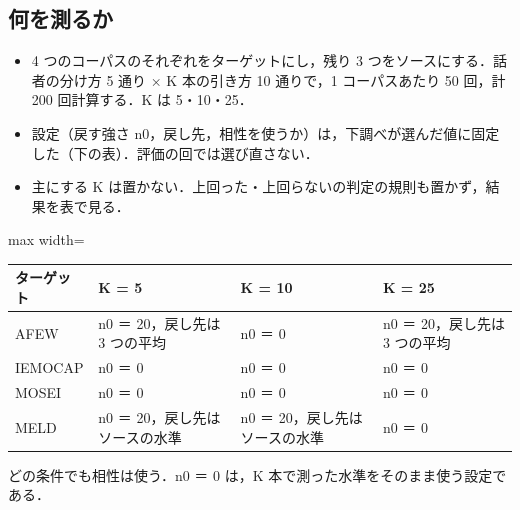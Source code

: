 \documentclass[a4paper,11pt]{ltjsarticle}
\begin{document}
\subsection*{何を測るか}
\begin{itemize}
  \item 4 つのコーパスのそれぞれをターゲットにし，残り 3 つをソースにする．話者の分け方 5 通り × K 本の引き方 10 通りで，1 コーパスあたり 50 回，計 200 回計算する．K は 5・10・25．
  \item 設定（戻す強さ n0，戻し先，相性を使うか）は，下調べが選んだ値に固定した（下の表）．評価の回では選び直さない．
  \item 主にする K は置かない．上回った・上回らないの判定の規則も置かず，結果を表で見る．
\end{itemize}
\begin{center}
\small
\begin{adjustbox}{max width=\linewidth}
\begin{tabular}{llll}
\toprule
ターゲット & K = 5 & K = 10 & K = 25 \\
\midrule
AFEW & n0 ＝ 20，戻し先は 3 つの平均 & n0 ＝ 0 & n0 ＝ 20，戻し先は 3 つの平均 \\
IEMOCAP & n0 ＝ 0 & n0 ＝ 0 & n0 ＝ 0 \\
MOSEI & n0 ＝ 0 & n0 ＝ 0 & n0 ＝ 0 \\
MELD & n0 ＝ 20，戻し先はソースの水準 & n0 ＝ 20，戻し先はソースの水準 & n0 ＝ 0 \\
\bottomrule
\end{tabular}
\end{adjustbox}

\smallskip
どの条件でも相性は使う．n0 ＝ 0 は，K 本で測った水準をそのまま使う設定である．
\end{center}
\end{document}
